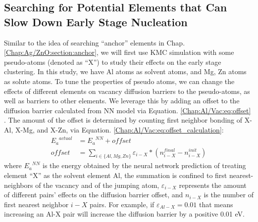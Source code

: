 \subsection{Searching for Potential Elements that Can Slow Down Early Stage Nucleation}
\label{Chap:Al/Vac:pseudo}
Similar to the idea of searching ``anchor'' elements in Chap. \ref{Chap:Ag/ZnO:section:anchor}, we will first use \ac{KMC} simulation with some pseudo-atoms (denoted as ``X'') to study their effects on the early stage clustering. In this study, we have Al atoms as solvent atoms, and Mg, Zn atoms as solute atoms. To tune the properties of pseudo atoms, we can change the effects of different elements on vacancy diffusion barriers to the pseudo-atoms, as well as barriers to other elements. We leverage this by adding an offset to the diffusion barrier calculated from \ac{NN} model via Equation. \ref{Chap:Al/Vac:eq:offset} . The amount of the offset is determined by counting first neighbor bonding of X-Al, X-Mg, and X-Zn, via Equation. \ref{Chap:Al/Vac:eq:offset_calculation}:
\begin{subequations}
\begin{align}
{E_a}^{actual} & = {E_a}^{NN} + \textit{offset} \label{Chap:Al/Vac:eq:offset} \\
\textit{offset} & = \sum_{i\in\{Al, Mg, Zn\}} \varepsilon_{i-X} * ( n_{i-X}^{final} - n_{i-X}^{init}) \label{Chap:Al/Vac:eq:offset_calculation}
\end{align}
\end{subequations}
where ${E_a}^{NN}$ is the energy obtained by the neural network prediction of treating element ``X'' as the solvent element Al, the summation is confined to first nearest-neighbors of the vacancy and of the jumping atom, $\varepsilon_{i-X}$ represents the amount of different pairs' effects on the diffusion barrier offset, and $n_{i-X}$ is the number of first nearest neighbor $i-X$ pairs. For example, if $\varepsilon_{Al-X} = 0.01$ that means increasing an Al-X pair will increase the diffusion barrier by a positive 0.01 eV.


